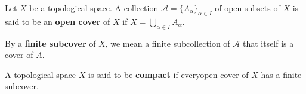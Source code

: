 \begin{defn}
    Let $X$ be a topological space. A collection $\mathscr{A} = \{ A_\alpha \}_{\alpha \in I}$ of open subsets of $X$ is said to be an \textbf{open cover} of $X$ if $X = \bigcup_{\alpha \in I} A_\alpha$.


    By a \textbf{finite subcover} of $X$, we mean a finite subcollection of $\mathscr{A}$ that itself is a cover of $A$.
\end{defn}

\begin{defn}
    A topological space $X$ is said to be \textbf{compact} if everyopen cover of $X$ has a finite subcover.
\end{defn}
